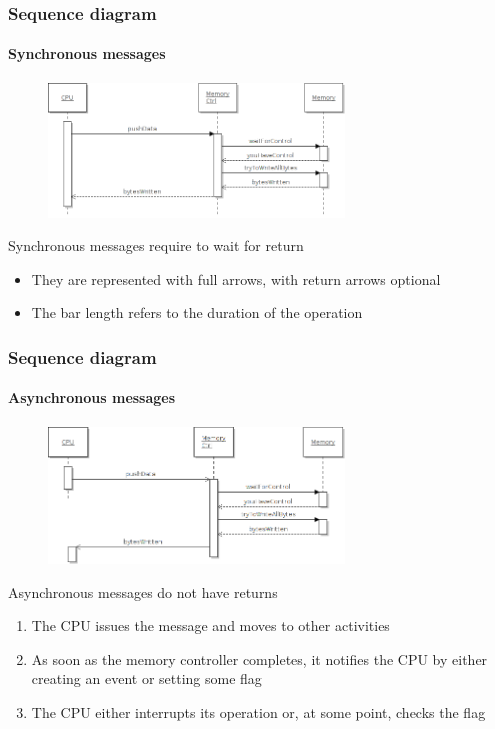 \begin{frame}
\frametitle{Sequence diagram}
\framesubtitle{Synchronous messages}

\begin{figure}
\includegraphics[width=0.7\textwidth]{lecture02/img/memory_sync.png}
\end{figure}

\begin{block}{Synchronous messages require to wait for return}
\begin{itemize}
\item They are represented with full arrows, with return arrows optional
\item The bar length refers to the duration of the operation
\end{itemize}
\end{block}
\end{frame}

\begin{frame}
\frametitle{Sequence diagram}
\framesubtitle{Asynchronous messages}

\begin{figure}
\includegraphics[width=0.7\textwidth]{lecture02/img/memory_async.png}
\end{figure}

\begin{block}{Asynchronous messages do not have returns}
\begin{enumerate}
\item The CPU issues the message and moves to other activities
\item As soon as the memory controller completes, it notifies the CPU by either creating an event or setting some flag
\item The CPU either interrupts its operation or, at some point, checks the flag
\end{enumerate}
\end{block}
\end{frame}

